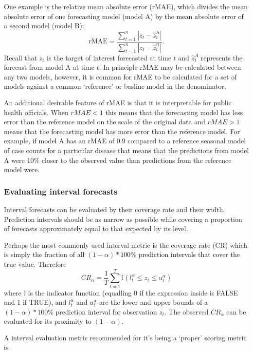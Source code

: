 \documentclass[a4paper]{article}
\begin{document}
One example is the relative mean absolute error (rMAE), which divides the mean absolute error of one forecasting model (model A) by the mean absolute error of a second model (model B): 
\begin{equation} 
\text{rMAE} =\frac{\sum_{t=1}^n|z_t-\hat{z}^{\text{A}}_t|}{\sum_{t=1}^n|z_t-\hat{z}^{\text{B}}_t|}. \label{eq:rMAE}
\end{equation}
Recall that $z_t$ is the target of interest forecasted at time $t$ and $\hat{z}^A_t$ represents the forecast from model A at time $t$.
In principle rMAE may be calculated between any two models, however, it is common for rMAE to be calculated for a set of models against a common `reference' or basline model in the denominator.

An additional desirable feature of rMAE is that it is interpretable for public health officials. When $rMAE<1$ this means that the forecasting model has less error than the reference model on the scale of the original data and $rMAE>1$ means that the forecasting model has more error than the reference model.
For example, if model A has an rMAE of 0.9 compared to a reference seasonal model of case counts for a particular disease that means that the predictions from model A were 10\% closer to the observed value than predictions from the reference model were.

\subsubsection{Evaluating interval forecasts}

Interval forecasts can be evaluated by their coverage rate and their width. 
Prediction intervals should be as narrow as possible while covering a proportion of forecasts approximately equal to that expected by its level.

Perhaps the most commonly used interval metric is the coverage rate (CR) which is simply the fraction of all $(1-\alpha)*100$\% prediction intervals that cover the true value. 
Therefore
$$ CR_\alpha = \frac{1}{T}\sum_{t=1}^T \mathbb{I}(l^\alpha_t \leq z_t \leq u^\alpha_t) $$
where $\mathbb{I}$ is the indicator function (equalling 0 if the expression inside is FALSE and 1 if TRUE), and $l^\alpha_t$ and $u^\alpha_t$ are the lower and upper bounds of a $(1-\alpha)*100$\% prediction interval for observation $z_t$.
The observed $CR_\alpha$ can be evaluated for its proximity to $(1-\alpha)$.

A interval evaluation metric recommended for it's being a `proper' scoring metric is\cite{Gneiting2007}
\end{document}
